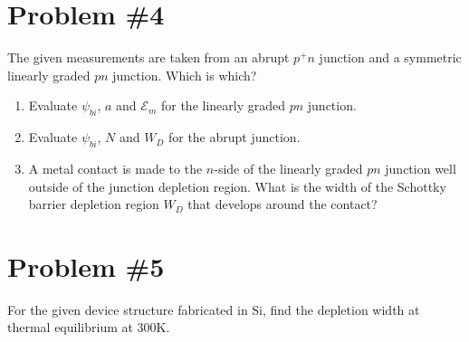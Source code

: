 \documentclass{article}
\begin{document}
\pagebreak

\section*{Problem \#4}
The given measurements are taken from an abrupt $p^{+}n$ junction and a
symmetric linearly graded $pn$ junction. Which is which?

\begin{enumerate}
  \item{Evaluate $\psi_{bi}$, $a$ and $\mathscr{E}_{m}$ for the
linearly graded $pn$ junction.}
  \item{Evaluate $\psi_{bi}$, $N$ and $W_D$ for the abrupt junction.}
  \item{A metal contact is made to the $n$-side of the linearly graded $pn$
  junction well outside of the junction depletion region. What is the width of
  the Schottky barrier depletion region $W_D$ that develops around the 
  contact?}
\end{enumerate}

\pagebreak

\section*{Problem \#5}
For the given device structure fabricated in Si, find the depletion width
at thermal equilibrium at 300K.
\end{document}
